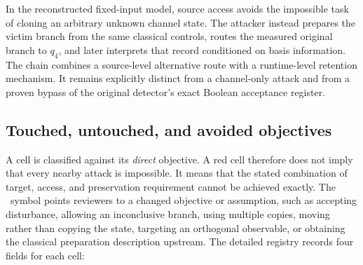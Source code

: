 \begin{tcolorbox}[
  enhanced,colback=SoftTeal,colframe=AdvancedTeal,boxrule=0.55pt,
  arc=1.5pt,left=8pt,right=8pt,top=8pt,bottom=8pt,
  title={Source description $\rightarrow$ retained branch $\rightarrow$ later value}]
\centering
{}
\end{tcolorbox}

In the reconstructed fixed-input model, source access avoids the impossible task
of cloning an arbitrary unknown channel state. The attacker instead prepares the
victim branch from the same classical controls, routes the measured original
branch to $q_4$, and later interprets that record conditioned on basis
information. The chain combines a source-level alternative route with a
runtime-level retention mechanism. It remains explicitly distinct from a
channel-only attack and from a proven bypass of the original detector's exact
Boolean acceptance register.

\subsection{Touched, untouched, and avoided objectives}

A cell is classified against its \emph{direct} objective. A red cell therefore
does not imply that every nearby attack is impossible. It means that the stated
combination of target, access, and preservation requirement cannot be achieved
exactly. The \workaround\ symbol points reviewers to a changed objective or
assumption, such as accepting disturbance, allowing an inconclusive branch,
using multiple copies, moving rather than copying the state, targeting an
orthogonal observable, or obtaining the classical preparation description
upstream. The detailed registry records four fields for each cell:

